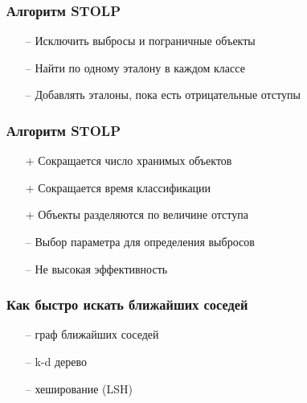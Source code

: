 \documentclass[12pt]{beamer}
\begin{document}
\begin{frame}\frametitle{Алгоритм STOLP}
\begin{itemize}
\item[--] Исключить выбросы и пограничные объекты
\item[--] Найти по одному эталону в каждом классе
\item[--] Добавлять эталоны, пока есть отрицательные отступы
\end{itemize}
\end{frame}

\begin{frame}\frametitle{Алгоритм STOLP}

\begin{itemize}
\item[+] Сокращается число хранимых объектов
\item[+] Сокращается время классификации
\item[+] Объекты разделяются по величине отступа
\end{itemize}
\vspace{5mm}
\begin{itemize}
\item[--] Выбор параметра для определения выбросов
\item[--] Не высокая эффективность
\end{itemize}
\end{frame}


\begin{frame}\frametitle{Как быстро искать ближайших соседей}
\begin{itemize}
\item[--] граф ближайших соседей
\item[--] k-d дерево
\item[--] хеширование (LSH)
\end{itemize}

\end{frame}



\end{document}
